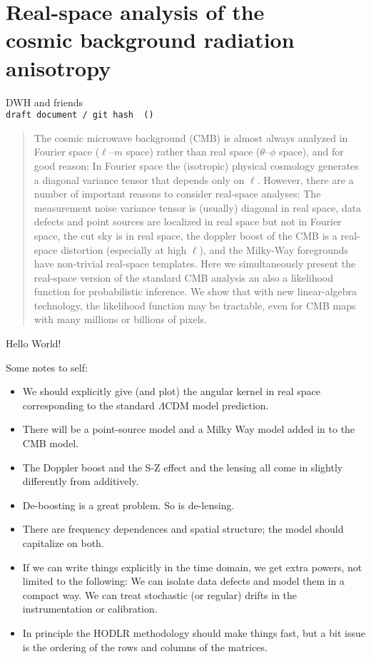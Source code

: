 \documentclass[12pt]{article}
\begin{document}
\section*{Real-space analysis of the \\ cosmic background radiation anisotropy}
\noindent
DWH and friends\\
{\footnotesize
\texttt{draft document / git hash \githash\ (\gitdate)}}

\begin{abstract}
The cosmic microwave background (CMB) is almost always analyzed
in Fourier space ($\ell$--$m$ space)
rather than real space ($\theta$--$\phi$ space), and for good reason:
In Fourier space the (isotropic) physical cosmology generates a
diagonal variance tensor that depends only on $\ell$.
However, there are a number of important reasons to consider
real-space analyses:
The measurement noise variance tensor is (usually) diagonal in real space,
data defects and point sources are localized in real space but not in Fourier space,
the cut sky is in real space, the doppler boost of the CMB
is a real-space distortion (especially at high $\ell$), and the
Milky-Way foregrounds have non-trivial real-space templates.
Here we simultaneously present the real-space version of the standard
CMB analysis an also a likelihood function for probabilistic
inference.
We show that with new linear-algebra technology, the likelihood
function may be tractable, even for CMB maps with many millions or
billions of pixels.
\end{abstract}

Hello World!

\clearpage

Some notes to self:
\begin{itemize}
\item We should explicitly give (and plot) the angular kernel in real space corresponding to the standard $\Lambda$CDM model prediction.
\item There will be a point-source model and a Milky Way model added in to the CMB model.
\item The Doppler boost and the S-Z effect and the lensing all come in slightly differently from additively.
\item De-boosting is a great problem.  So is de-lensing.
\item There are frequency dependences and spatial structure; the model should capitalize on both.
\item If we can write things explicitly in the time domain, we get extra powers, not limited to the following:  We can isolate data defects and model them in a compact way.  We can treat stochastic (or regular) drifts in the instrumentation or calibration.
\item In principle the HODLR methodology should make things fast, but a bit issue is the ordering of the rows and columns of the matrices.
\end{itemize}
\end{document}
